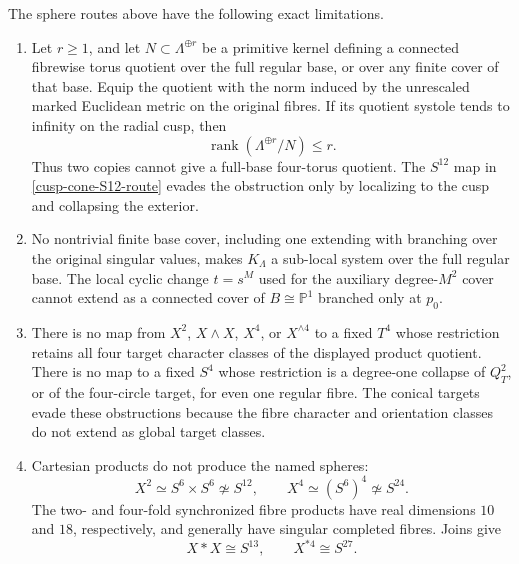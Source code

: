 \begin{theorem}
\label{cusp-cone-obstructions}
The sphere routes above have the following exact limitations.
\begin{enumerate}
\item Let \(r\geq1\), and let \(N\subset\Lambda^{\oplus r}\) be a
primitive kernel defining a connected fibrewise torus quotient over the
full regular base, or over any finite cover of that base.  Equip the quotient
with the norm induced by the unrescaled marked Euclidean metric on the
original fibres.  If its quotient systole tends to infinity on the radial
cusp, then
\begin{equation}
 \operatorname{rank}(\Lambda^{\oplus r}/N)\leq r.
 \label{cusp-cone-rank-bound}
\end{equation}
Thus two copies cannot give a full-base four-torus quotient.  The
\(S^{12}\) map in \cref{cusp-cone-S12-route} evades the obstruction only by
localizing to the cusp and collapsing the exterior.

\item No nontrivial finite base cover, including one extending with
branching over the original singular values, makes \(K_\Lambda\) a
sub-local system over the full regular base.  The local cyclic change
\(t=s^M\) used for the auxiliary degree-\(M^2\) cover cannot extend as a
connected cover of \(B\cong\mathbb P^1\) branched only at \(p_0\).

\item There is no map from \(X^2\), \(X\wedge X\), \(X^4\), or
\(X^{\wedge4}\) to a fixed \(T^4\) whose restriction retains all four
target character classes of the displayed product quotient.  There is no
map to a fixed \(S^4\) whose restriction is a degree-one collapse of
\(Q_T^2\), or of the four-circle target, for even one regular fibre.  The
conical targets evade these obstructions because the fibre character and
orientation classes do not extend as global target classes.

\item Cartesian products do not produce the named spheres:
\begin{equation}
 X^2\simeq S^6\times S^6\not\simeq S^{12},\qquad
 X^4\simeq(S^6)^4\not\simeq S^{24}.
 \label{cusp-cone-products-not-spheres}
\end{equation}
The two- and four-fold synchronized fibre products have real dimensions
\(10\) and \(18\), respectively, and generally have singular completed
fibres.  Joins give
\begin{equation}
 X*X\cong S^{13},\qquad X^{*4}\cong S^{27}.
 \label{cusp-cone-join-dimensions}
\end{equation}


\end{enumerate}
\end{theorem}
